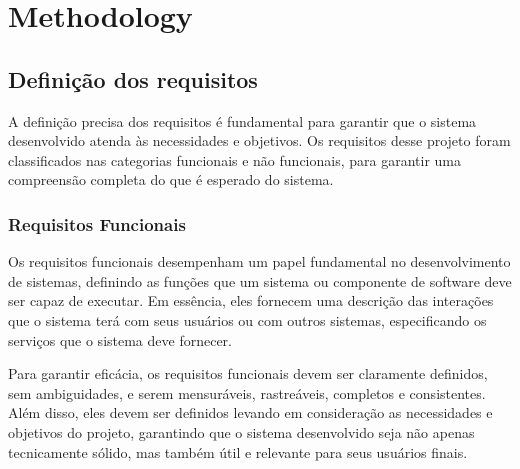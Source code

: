 



\chapter{Methodology}\label{cap:metodology} 

\section[Definição dos requisitos]{Definição dos requisitos}
A definição precisa dos requisitos é fundamental para garantir que o sistema desenvolvido atenda às necessidades e objetivos. Os requisitos desse projeto foram classificados nas categorias funcionais e não funcionais, para garantir uma compreensão completa do que é esperado do sistema.

\subsection[Requisitos Funcionais]{Requisitos Funcionais}
Os requisitos funcionais desempenham um papel fundamental no desenvolvimento de sistemas, definindo as funções que um sistema ou componente de software deve ser capaz de executar. Em essência, eles fornecem uma descrição das interações que o sistema terá com seus usuários ou com outros sistemas, especificando os serviços que o sistema deve fornecer.

Para garantir eficácia, os requisitos funcionais devem ser claramente definidos, sem ambiguidades, e serem mensuráveis, rastreáveis, completos e consistentes. Além disso, eles devem ser definidos levando em consideração as necessidades e objetivos do projeto, garantindo que o sistema desenvolvido seja não apenas tecnicamente sólido, mas também útil e relevante para seus usuários finais.

